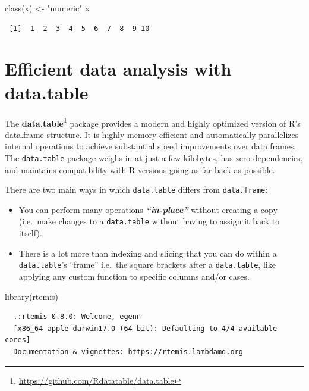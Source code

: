 \documentclass[
]{book}
\newenvironment{Shaded}{\begin{snugshade}}{\end{snugshade}}
\newcommand{\FunctionTok}[1]{\textcolor[rgb]{0.00,0.00,0.00}{#1}}
\newcommand{\NormalTok}[1]{#1}
\newcommand{\OtherTok}[1]{\textcolor[rgb]{0.56,0.35,0.01}{#1}}
\newcommand{\StringTok}[1]{\textcolor[rgb]{0.31,0.60,0.02}{#1}}
\DeclareRobustCommand{\href}[2]{#2\footnote{\url{#1}}}
\providecommand{\tightlist}{%
  \setlength{\itemsep}{0pt}\setlength{\parskip}{0pt}}
\renewcommand{\href}[2]{#2\footnote{\url{#1}}}
\begin{document}
\begin{Shaded}
\begin{Highlighting}[]
\FunctionTok{class}\NormalTok{(x) }\OtherTok{\textless{}{-}} \StringTok{"numeric"}
\NormalTok{x}
\end{Highlighting}
\end{Shaded}

\begin{verbatim}
 [1]  1  2  3  4  5  6  7  8  9 10
\end{verbatim}

\hypertarget{datatable}{%
\chapter{\texorpdfstring{Efficient data analysis with \textbf{data.table}}{Efficient data analysis with data.table}}\label{datatable}}

The \href{https://github.com/Rdatatable/data.table}{\textbf{data.table}} package provides a modern and highly optimized version of R's data.frame structure. It is highly memory efficient and automatically parallelizes internal operations to achieve substantial speed improvements over data.frames. The \texttt{data.table} package weighs in at just a few kilobytes, has zero dependencies, and maintains compatibility with R versions going as far back as possible.

There are two main ways in which \texttt{data.table} differs from \texttt{data.frame}:

\begin{itemize}
\tightlist
\item
  You can perform many operations \textbf{\emph{``in-place''}} without creating a copy (i.e.~make changes to a \texttt{data.table} without having to assign it back to itself).
\item
  There is a lot more than indexing and slicing that you can do within a \texttt{data.table}'s ``frame'' i.e.~the square brackets after a \texttt{data.table}, like applying any custom function to specific columns and/or cases.
\end{itemize}

\begin{Shaded}
\begin{Highlighting}[]
\FunctionTok{library}\NormalTok{(rtemis)}
\end{Highlighting}
\end{Shaded}

\begin{verbatim}
  .:rtemis 0.8.0: Welcome, egenn
  [x86_64-apple-darwin17.0 (64-bit): Defaulting to 4/4 available cores]
  Documentation & vignettes: https://rtemis.lambdamd.org
\end{verbatim}
\end{document}

